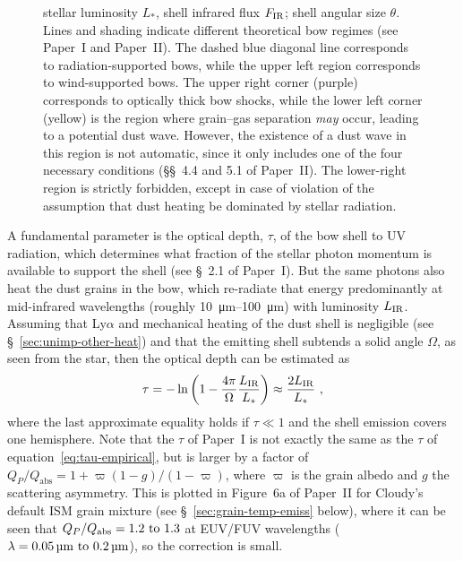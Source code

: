 \begin{figure}
{    stellar luminosity \(L_*\), shell infrared flux \(F_{\text{IR}}\); shell
    angular size \(\theta\).  Lines and shading indicate different
    theoretical bow regimes (see Paper~I and Paper~II).  The dashed
    blue diagonal line corresponds to radiation-supported bows, while
    the upper left region corresponds to wind-supported bows.  The
    upper right corner (purple) corresponds to optically thick bow
    shocks, while the lower left corner (yellow) is the region where
    grain--gas separation \textit{may} occur, leading to a potential
    dust wave.  However, the existence of a dust wave in this region
    is not automatic, since it only includes one of the four necessary
    conditions (\S\S~4.4 and 5.1 of Paper~II). The lower-right region
    is strictly forbidden, except in case of violation of the
    assumption that dust heating be dominated by stellar radiation. }
  \label{fig:All-sources-eta-tau}
\end{figure}


A fundamental parameter is the optical depth, \(\tau\), of the bow
shell to UV radiation, which determines what fraction of the stellar
photon momentum is available to support the shell (see
\S~2.1 of Paper~I).  But the same photons also heat the
dust grains in the bow, which re-radiate that energy predominantly at
mid-infrared wavelengths (roughly \SIrange{10}{100}{\um}) with
luminosity \(L_{\text{IR}}\).  Assuming that Ly\(\alpha\) and mechanical
heating of the dust shell is negligible (see
\S~\ref{sec:unimp-other-heat}) and that the emitting shell subtends a
solid angle \(\Omega\), as seen from the star, then the optical depth
can be estimated as
\begin{equation}
  \label{eq:tau-empirical}
  \tau = -\ln \left( 1 - \frac{4\pi}{\Omega} \frac{L_{\text{IR}}}{L_*} \right)
  \approx \frac{2 L_{\text{IR}}}{L_*} \ ,
\end{equation}
where the last approximate equality holds if \(\tau \ll 1\) and the shell
emission covers one hemisphere.  Note that the \(\tau\) of Paper~I is not
exactly the same as the \(\tau\) of equation~\eqref{eq:tau-empirical},
but is larger by a factor of
\(Q_P / Q_{\text{abs}} = 1 + \varpi (1 - g)/(1 - \varpi)\), where
\(\varpi\) is the grain albedo and \(g\) the scattering asymmetry.
This is plotted in Figure~6a of Paper~II for Cloudy's default ISM
grain mixture (see \S~\ref{sec:grain-temp-emiss} below), where it can
be seen that \(Q_P / Q_{\text{abs}} = \text{\numrange{1.2}{1.3}}\) at
EUV/FUV wavelengths (\(\lambda = \text{\SIrange{0.05}{0.2}{\um}}\)), so the
correction is small.

